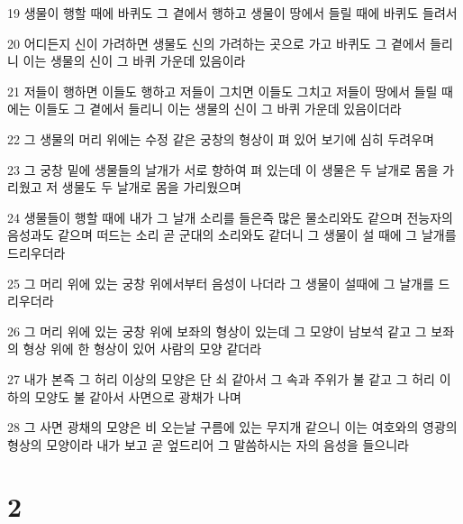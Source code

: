 \par 19 생물이 행할 때에 바퀴도 그 곁에서 행하고 생물이 땅에서 들릴 때에 바퀴도 들려서
\par 20 어디든지 신이 가려하면 생물도 신의 가려하는 곳으로 가고 바퀴도 그 곁에서 들리니 이는 생물의 신이 그 바퀴 가운데 있음이라
\par 21 저들이 행하면 이들도 행하고 저들이 그치면 이들도 그치고 저들이 땅에서 들릴 때에는 이들도 그 곁에서 들리니 이는 생물의 신이 그 바퀴 가운데 있음이더라
\par 22 그 생물의 머리 위에는 수정 같은 궁창의 형상이 펴 있어 보기에 심히 두려우며
\par 23 그 궁창 밑에 생물들의 날개가 서로 향하여 펴 있는데 이 생물은 두 날개로 몸을 가리웠고 저 생물도 두 날개로 몸을 가리웠으며
\par 24 생물들이 행할 때에 내가 그 날개 소리를 들은즉 많은 물소리와도 같으며 전능자의 음성과도 같으며 떠드는 소리 곧 군대의 소리와도 같더니 그 생물이 설 때에 그 날개를 드리우더라
\par 25 그 머리 위에 있는 궁창 위에서부터 음성이 나더라 그 생물이 설때에 그 날개를 드리우더라
\par 26 그 머리 위에 있는 궁창 위에 보좌의 형상이 있는데 그 모양이 남보석 같고 그 보좌의 형상 위에 한 형상이 있어 사람의 모양 같더라
\par 27 내가 본즉 그 허리 이상의 모양은 단 쇠 같아서 그 속과 주위가 불 같고 그 허리 이하의 모양도 불 같아서 사면으로 광채가 나며
\par 28 그 사면 광채의 모양은 비 오는날 구름에 있는 무지개 같으니 이는 여호와의 영광의 형상의 모양이라 내가 보고 곧 엎드리어 그 말씀하시는 자의 음성을 들으니라

\chapter{2}

